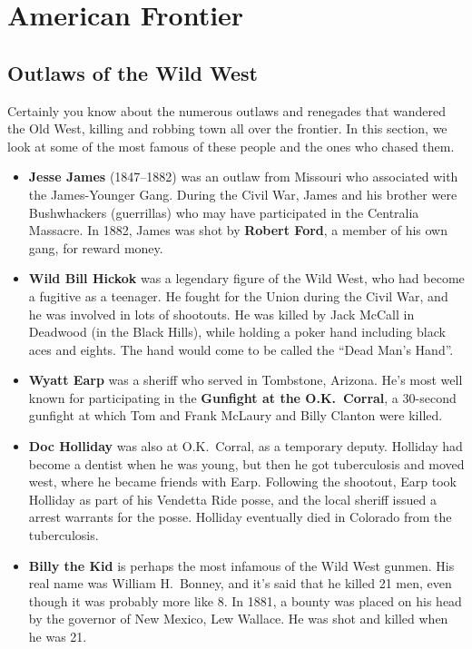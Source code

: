 \section{American Frontier}

\subsection*{Outlaws of the Wild West}

Certainly you know about the numerous outlaws and renegades that wandered the Old West,
killing and robbing town all over the frontier.
In this section, we look at some of the most famous of these people and the ones who chased them.

\begin{itemize}
  \item
    \textbf{Jesse James} (1847--1882) was an outlaw from Missouri who associated with the James-Younger Gang.
    During the Civil War,
    James and his brother were Bushwhackers (guerrillas) who may have participated in the Centralia Massacre.
    In 1882, James was shot by \textbf{Robert Ford}, a member of his own gang, for reward money.

  \item
    \textbf{Wild Bill Hickok} was a legendary figure of the Wild West, who had become a fugitive as a teenager.
    He fought for the Union during the Civil War, and he was involved in lots of shootouts.
    He was killed by Jack McCall in Deadwood (in the Black Hills),
    while holding a poker hand including black aces and eights.
    The hand would come to be called the ``Dead Man's Hand''.

  \item
    \textbf{Wyatt Earp} was a sheriff who served in Tombstone, Arizona.
    He's most well known for participating in the \textbf{Gunfight at the O.K.\ Corral},
    a 30-second gunfight at which Tom and Frank McLaury and Billy Clanton were killed.

  \item
    \textbf{Doc Holliday} was also at O.K.\ Corral, as a temporary deputy.
    Holliday had become a dentist when he was young, but then he got tuberculosis and moved west,
    where he became friends with Earp.
    Following the shootout, Earp took Holliday as part of his Vendetta Ride posse,
    and the local sheriff issued a arrest warrants for the posse.
    Holliday eventually died in Colorado from the tuberculosis.

  \item
    \textbf{Billy the Kid} is perhaps the most infamous of the Wild West gunmen.
    His real name was William H.\ Bonney, and it's said that he killed 21 men, even though it was probably more like 8.
    In 1881, a bounty was placed on his head by the governor of New Mexico, Lew Wallace.
    He was shot and killed when he was 21.

\end{itemize}

